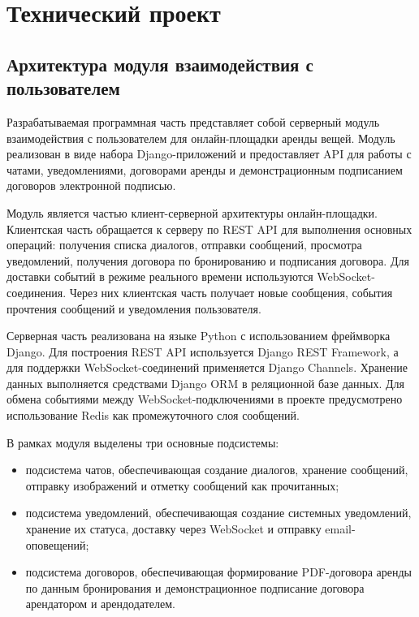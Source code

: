 \renewcommand\UrlFont{\normalfont}
\section{Технический проект}
\subsection{Архитектура модуля взаимодействия с пользователем}

Разрабатываемая программная часть представляет собой серверный модуль взаимодействия с пользователем для онлайн-площадки аренды вещей. Модуль реализован в виде набора Django-приложений и предоставляет API для работы с чатами, уведомлениями, договорами аренды и демонстрационным подписанием договоров электронной подписью.

Модуль является частью клиент-серверной архитектуры онлайн-площадки. Клиентская часть обращается к серверу по REST API для выполнения основных операций: получения списка диалогов, отправки сообщений, просмотра уведомлений, получения договора по бронированию и подписания договора. Для доставки событий в режиме реального времени используются WebSocket-соединения. Через них клиентская часть получает новые сообщения, события прочтения сообщений и уведомления пользователя.

Серверная часть реализована на языке Python с использованием фреймворка Django. Для построения REST API используется Django REST Framework, а для поддержки WebSocket-соединений применяется Django Channels. Хранение данных выполняется средствами Django ORM в реляционной базе данных. Для обмена событиями между WebSocket-подключениями в проекте предусмотрено использование Redis как промежуточного слоя сообщений.

В рамках модуля выделены три основные подсистемы:
\begin{itemize}
    \item подсистема чатов, обеспечивающая создание диалогов, хранение сообщений, отправку изображений и отметку сообщений как прочитанных;
    \item подсистема уведомлений, обеспечивающая создание системных уведомлений, хранение их статуса, доставку через WebSocket и отправку email-оповещений;
    \item подсистема договоров, обеспечивающая формирование PDF-договора аренды по данным бронирования и демонстрационное подписание договора арендатором и арендодателем.
\end{itemize}


